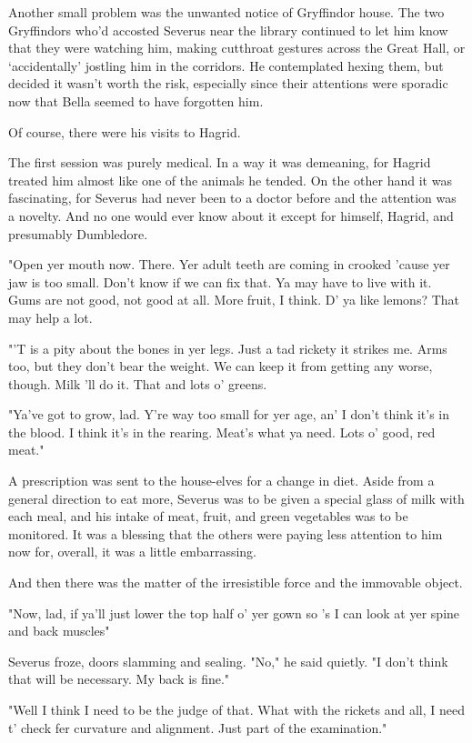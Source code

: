 Another small problem was the unwanted notice of Gryffindor house. The two Gryffindors who'd accosted Severus near the library continued to let him know that they were watching him, making cutthroat gestures across the Great Hall, or `accidentally' jostling him in the corridors. He contemplated hexing them, but decided it wasn't worth the risk, especially since their attentions were sporadic now that Bella seemed to have forgotten him.

Of course, there were his visits to Hagrid.

The first session was purely medical. In a way it was demeaning, for Hagrid treated him almost like one of the animals he tended. On the other hand it was fascinating, for Severus had never been to a doctor before and the attention was a novelty. And no one would ever know about it except for himself, Hagrid, and presumably Dumbledore.

"Open yer mouth now. There. Yer adult teeth are coming in crooked 'cause yer jaw is too small. Don't know if we can fix that. Ya may have to live with it. Gums are not good, not good at all. More fruit, I think. D' ya like lemons? That may help a lot.

"'T is a pity about the bones in yer legs. Just a tad rickety it strikes me. Arms too, but they don't bear the weight. We can keep it from getting any worse, though. Milk 'll do it. That and lots o' greens.

"Ya've got to grow, lad. Y're way too small for yer age, an' I don't think it's in the blood. I think it's in the rearing. Meat's what ya need. Lots o' good, red meat."

A prescription was sent to the house-elves for a change in diet. Aside from a general direction to eat more, Severus was to be given a special glass of milk with each meal, and his intake of meat, fruit, and green vegetables was to be monitored. It was a blessing that the others were paying less attention to him now for, overall, it was a little{\el} embarrassing.

And then there was the matter of the irresistible force and the immovable object.

"Now, lad, if ya'll just lower the top half o' yer gown so 's I can look at yer spine and back muscles{\el}"

Severus froze, doors slamming and sealing. "No," he said quietly. "I don't think that will be necessary. My back is fine."

"Well I think I need to be the judge of that. What with the rickets and all, I need t' check fer curvature and alignment. Just part of the examination."

